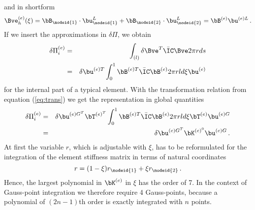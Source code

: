 and in shortform
\begin{equation}
\Bve^{(e)}_h(\xi) = \bB_{\nodeid{1}} \cdot \bu_{\nodeid{1}}^L + 
\bB_{\nodeid{2}} \cdot \bu_{\nodeid{2}}^L = \bB^{(e)}
\bu^{(e)L} \, .
\end{equation}
If we insert the approximations in $\delta \Pi$, we obtain 
\begin{eqnarray}
\delta \Pi_i^{(e)} & = & \int_{(l)} \delta \Bve^T 
\bar{\bf \IC} \Bve 2 \pi r ds\\
                   & = & \delta \bu^{(e)T} \int_0^1 \bB^{(e)T} 
                   \bar{\bf \IC} \bB^{(e)} 2 \pi r l d \xi \bu^{(e)}
\end{eqnarray}
for the internal part of a typical element. 
With the transformation relation from equation 
(\ref{eq:trans}) we get the representation in 
global quantities
\begin{eqnarray}
\delta \Pi_i^{(e)} & = & \delta \bu^{(e)G^T} \bT^{(e)^T} 
\int_0^1 \bB^{(e)T} \bar{\bf \IC} \bB^{(e)} 2 \pi r l d \xi \bT^{(e)} 
\bu^{(e)G} \\
                   & = & \delta \bu^{(e)G^T} \bK^{(e)^0}\bu^{(e)G} \, . 
\end{eqnarray}
At first the variable $r$, which is adjustable with $\xi$, 
has to be reformulated for the integration of the element 
stiffness matrix in terms of natural coordinates 
\begin{equation}
r = (1 - \xi) r_{\nodeid{1}} + \xi r_{\nodeid{2}} \, .
\end{equation}
Hence, the largest polynomial in $\bK^{(e)}$ in $\xi $ has 
the order of 7. 
In the context of Gauss-point integration we therefore 
require 4 Gauss-points, because a polynomial of $(2n-1)$th 
order is exactly integrated with $n$ points. 















